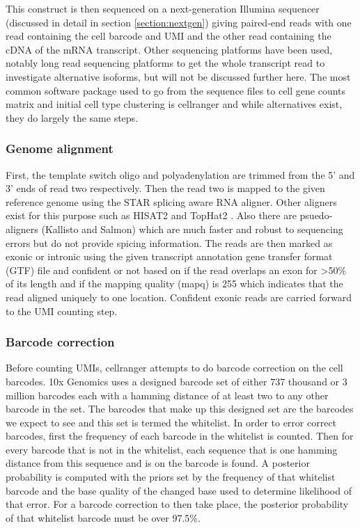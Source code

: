 \par{
This construct is then sequenced on a next-generation Illumina sequencer \cite{bridgeamp}\cite{illuminareview} (discussed in detail in section \ref{section:nextgen}) giving paired-end reads with one read containing the cell barcode and UMI and the other read containing the cDNA of the mRNA transcript. Other sequencing platforms have been used, notably long read sequencing platforms to get the whole transcript read to investigate alternative isoforms, but will not be discussed further here\cite{tilgner}\cite{isoformseq}\cite{longreadsinglecell}. The most common software package used to go from the sequence files to cell gene counts matrix and initial cell type clustering is cellranger\cite{cellranger} and while alternatives exist\cite{dropseqsoft}, they do largely the same steps. 
}

\subsubsection{Genome alignment}

\par{
First, the template switch oligo and polyadenylation are trimmed from the 5' and 3' ends of read two respectively. Then the read two is mapped to the given reference genome using the STAR splicing aware RNA aligner\cite{STAR}. Other aligners exist for this purpose such as HISAT2 \cite{hisat} and TopHat2 \cite{tophat2}. Also there are psuedo-aligners (Kallisto\cite{kallisto} and Salmon\cite{salmon}) which are much faster and robust to sequencing errors but do not provide spicing information\cite{alignfree}. The reads are then marked as exonic or intronic using the given transcript annotation gene transfer format (GTF) file and confident or not based on if the read overlaps an exon for >50\% of its length and if the mapping quality (mapq) is 255 which indicates that the read aligned uniquely to one location. Confident exonic reads are carried forward to the UMI counting step\cite{singlecelloverview}.
}

\subsubsection{Barcode correction}
\par{
Before counting UMIs, cellranger attempts to do barcode correction on the cell barcodes. 10x Genomics uses a designed barcode set of either 737 thousand or 3 million barcodes each with a hamming distance\cite{hamming} of at least two to any other barcode in the set. The barcodes that make up this designed set are the barcodes we expect to see and this set is termed the whitelist. In order to error correct barcodes, first the frequency of each barcode in the whitelist is counted. Then for every barcode that is not in the whitelist, each sequence that is one hamming distance from this sequence and is on the barcode is found. A posterior probability is computed with the priors set by the frequency of that whitelist barcode and the base quality of the changed base used to determine likelihood of that error. For a barcode correction to then take place, the posterior probability of that whitelist barcode must be over 97.5\%\cite{barcodecorrection}.
}

